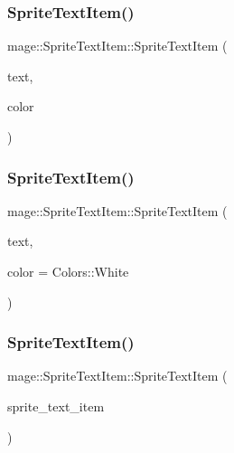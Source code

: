 \subsubsection{\texorpdfstring{Sprite\+Text\+Item()}{SpriteTextItem()}\hspace{0.1cm}{\footnotesize\ttfamily [1/4]}}
{\footnotesize\ttfamily mage\+::\+Sprite\+Text\+Item\+::\+Sprite\+Text\+Item (\begin{DoxyParamCaption}\item[{const wstring \&}]{text,  }\item[{const \hyperlink{structmage_1_1_color}{Color} \&}]{color }\end{DoxyParamCaption})\hspace{0.3cm}{\ttfamily [explicit]}}

\hypertarget{structmage_1_1_sprite_text_item_a127d499a50f0dd11b3e3b6598f4b2088}{}\label{structmage_1_1_sprite_text_item_a127d499a50f0dd11b3e3b6598f4b2088} 
\subsubsection{\texorpdfstring{Sprite\+Text\+Item()}{SpriteTextItem()}\hspace{0.1cm}{\footnotesize\ttfamily [2/4]}}
{\footnotesize\ttfamily mage\+::\+Sprite\+Text\+Item\+::\+Sprite\+Text\+Item (\begin{DoxyParamCaption}\item[{const wstring \&}]{text,  }\item[{const X\+M\+V\+E\+C\+T\+OR \&}]{color = {\ttfamily Colors\+:\+:White} }\end{DoxyParamCaption})\hspace{0.3cm}{\ttfamily [explicit]}}

\hypertarget{structmage_1_1_sprite_text_item_ae5cbffcab97065bb719aafda3dd4ab5d}{}\label{structmage_1_1_sprite_text_item_ae5cbffcab97065bb719aafda3dd4ab5d} 
\subsubsection{\texorpdfstring{Sprite\+Text\+Item()}{SpriteTextItem()}\hspace{0.1cm}{\footnotesize\ttfamily [3/4]}}
{\footnotesize\ttfamily mage\+::\+Sprite\+Text\+Item\+::\+Sprite\+Text\+Item (\begin{DoxyParamCaption}\item[{const \hyperlink{structmage_1_1_sprite_text_item}{Sprite\+Text\+Item} \&}]{sprite\+\_\+text\+\_\+item }\end{DoxyParamCaption})\hspace{0.3cm}{\ttfamily [default]}}

